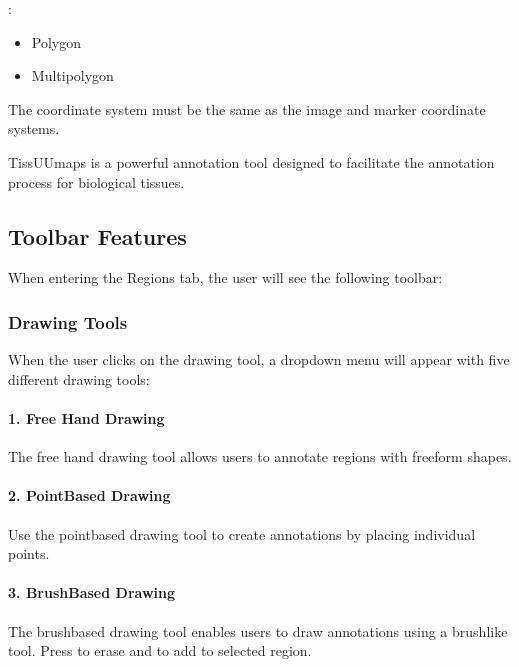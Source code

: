 \documentclass[letterpaper,10pt,english,openany,oneside]{sphinxmanual}
\begin{document}
\sphinxAtStartPar
{}:
\begin{itemize}
\item {} 
\sphinxAtStartPar
Polygon

\item {} 
\sphinxAtStartPar
Multipolygon

\end{itemize}

\sphinxAtStartPar
The coordinate system must be the same as the image and marker coordinate systems.

\sphinxAtStartPar
TissUUmaps is a powerful annotation tool designed to facilitate the annotation process for biological tissues.


\subsection{Toolbar Features}
\label{\detokenize{docs/starting/regions:toolbar-features}}
\sphinxAtStartPar
When entering the Regions tab, the user will see the following toolbar:


\subsubsection{Drawing Tools}
\label{\detokenize{docs/starting/regions:drawing-tools}}
\sphinxAtStartPar
When the user clicks on the drawing tool, a dropdown menu will appear with five different drawing tools:


\paragraph{1. Free Hand Drawing}
\label{\detokenize{docs/starting/regions:free-hand-drawing}}
\sphinxAtStartPar
The free hand drawing tool allows users to annotate regions with free\sphinxhyphen{}form shapes.


\paragraph{2. Point\sphinxhyphen{}Based Drawing}
\label{\detokenize{docs/starting/regions:point-based-drawing}}
\sphinxAtStartPar
Use the point\sphinxhyphen{}based drawing tool to create annotations by placing individual points.


\paragraph{3. Brush\sphinxhyphen{}Based Drawing}
\label{\detokenize{docs/starting/regions:brush-based-drawing}}
\sphinxAtStartPar
The brush\sphinxhyphen{}based drawing tool enables users to draw annotations using a brush\sphinxhyphen{}like tool. Press  to erase and  to add to selected region.
\end{document}

